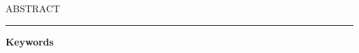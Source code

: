 

\begin{center}
\MakeUppercase{\LARGE{A}\Large{bstract}} \\
\noindent\rule{17cm}{0.4pt}
\end{center}

\large{\textbf{Keywords}}